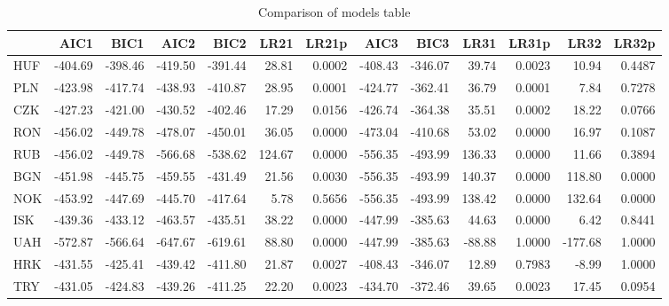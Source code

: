 \documentclass[12pt, a4paper, oneside]{article} %
\begin{document}

\begin{landscape}
\begin{table}[ht]
\centering
\begin{tabular}{l|rrrrrrrrrrrr}
  \hline
 & AIC1 & BIC1 & AIC2 & BIC2 & LR21 & LR21p & AIC3 & BIC3 & LR31 & LR31p & LR32 & LR32p \\ 
  \hline
HUF & -404.69 & -398.46 & -419.50 & -391.44 & 28.81 & 0.0002 & -408.43 & -346.07 & 39.74 & 0.0023 & 10.94 & 0.4487 \\ 
  PLN & -423.98 & -417.74 & -438.93 & -410.87 & 28.95 & 0.0001 & -424.77 & -362.41 & 36.79 & 0.0001 & 7.84 & 0.7278 \\ 
  CZK & -427.23 & -421.00 & -430.52 & -402.46 & 17.29 & 0.0156 & -426.74 & -364.38 & 35.51 & 0.0002 & 18.22 & 0.0766 \\ 
  RON & -456.02 & -449.78 & -478.07 & -450.01 & 36.05 & 0.0000 & -473.04 & -410.68 & 53.02 & 0.0000 & 16.97 & 0.1087 \\ 
  RUB & -456.02 & -449.78 & -566.68 & -538.62 & 124.67 & 0.0000 & -556.35 & -493.99 & 136.33 & 0.0000 & 11.66 & 0.3894 \\ 
  BGN & -451.98 & -445.75 & -459.55 & -431.49 & 21.56 & 0.0030 & -556.35 & -493.99 & 140.37 & 0.0000 & 118.80 & 0.0000 \\ 
  NOK & -453.92 & -447.69 & -445.70 & -417.64 & 5.78 & 0.5656 & -556.35 & -493.99 & 138.42 & 0.0000 & 132.64 & 0.0000 \\ 
  ISK & -439.36 & -433.12 & -463.57 & -435.51 & 38.22 & 0.0000 & -447.99 & -385.63 & 44.63 & 0.0000 & 6.42 & 0.8441 \\ 
  UAH & -572.87 & -566.64 & -647.67 & -619.61 & 88.80 & 0.0000 & -447.99 & -385.63 & -88.88 & 1.0000 & -177.68 & 1.0000 \\ 
  HRK & -431.55 & -425.41 & -439.42 & -411.80 & 21.87 & 0.0027 & -408.43 & -346.07 & 12.89 & 0.7983 & -8.99 & 1.0000 \\ 
  TRY & -431.05 & -424.83 & -439.26 & -411.25 & 22.20 & 0.0023 & -434.70 & -372.46 & 39.65 & 0.0023 & 17.45 & 0.0954 \\ 
   \hline
\end{tabular}
\caption{Comparison of models table} 
\label{tabref:comptab}
\end{table}
\end{landscape}


\end{document}
